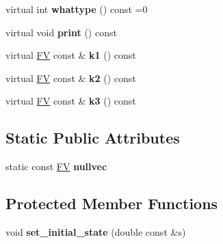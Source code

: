 \begin{DoxyCompactItemize}
\item 
\hypertarget{classPS__2_ac3bb7468d7b1e1b62018f13a1121e86a}{}virtual int {\bfseries whattype} () const =0\label{classPS__2_ac3bb7468d7b1e1b62018f13a1121e86a}

\item 
\hypertarget{classPS__2_a395f9455cfdebcfd145ba679c43ac2c5}{}virtual void {\bfseries print} () const \label{classPS__2_a395f9455cfdebcfd145ba679c43ac2c5}

\item 
\hypertarget{classPS__2_a1a073b4fd3fafa46dceabcf77f4b3c44}{}virtual \hyperlink{classFV}{F\+V} const \& {\bfseries k1} () const \label{classPS__2_a1a073b4fd3fafa46dceabcf77f4b3c44}

\item 
\hypertarget{classPS__2_a9caf1d80ebd0718a226e05bf42cfa4c9}{}virtual \hyperlink{classFV}{F\+V} const \& {\bfseries k2} () const \label{classPS__2_a9caf1d80ebd0718a226e05bf42cfa4c9}

\item 
\hypertarget{classPS__2_aaa94aa598e69a134fab3bc2fc6c3185b}{}virtual \hyperlink{classFV}{F\+V} const \& {\bfseries k3} () const \label{classPS__2_aaa94aa598e69a134fab3bc2fc6c3185b}

\end{DoxyCompactItemize}
\subsection*{Static Public Attributes}
\begin{DoxyCompactItemize}
\item 
\hypertarget{classPS__2_af361ee1bfe02e206f8845db7f1da57c6}{}static const \hyperlink{classFV}{F\+V} {\bfseries nullvec}\label{classPS__2_af361ee1bfe02e206f8845db7f1da57c6}

\end{DoxyCompactItemize}
\subsection*{Protected Member Functions}
\begin{DoxyCompactItemize}
\item 
\hypertarget{classPS__2_a6d49cef4b1eb1138b947c9ec9b448538}{}void {\bfseries set\+\_\+initial\+\_\+state} (double const \&s)\label{classPS__2_a6d49cef4b1eb1138b947c9ec9b448538}

\end{DoxyCompactItemize}
